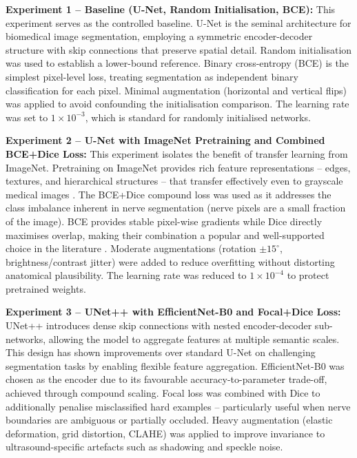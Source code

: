 \documentclass[11pt,a4paper]{article}
\begin{document}
\textbf{Experiment 1 -- Baseline (U-Net, Random Initialisation, BCE):}
This experiment serves as the controlled baseline. U-Net \cite{ronneberger2015unet} is the
seminal architecture for biomedical image segmentation, employing a symmetric
encoder-decoder structure with skip connections that preserve spatial detail.
Random initialisation was used to establish a lower-bound reference.
Binary cross-entropy (BCE) is the simplest pixel-level loss, treating segmentation
as independent binary classification for each pixel.
Minimal augmentation (horizontal and vertical flips) was applied to avoid confounding
the initialisation comparison.
The learning rate was set to $1 \times 10^{-3}$, which is standard for randomly
initialised networks.

\textbf{Experiment 2 -- U-Net with ImageNet Pretraining and Combined BCE+Dice Loss:}
This experiment isolates the benefit of transfer learning from ImageNet.
Pretraining on ImageNet provides rich feature representations -- edges, textures,
and hierarchical structures -- that transfer effectively even to grayscale medical images
\cite{tajbakhsh2016cnn}.
The BCE+Dice compound loss was used as it addresses the class imbalance inherent in
nerve segmentation (nerve pixels are a small fraction of the image).
BCE provides stable pixel-wise gradients while Dice directly maximises overlap,
making their combination a popular and well-supported choice in the literature
\cite{sudre2017generalised}.
Moderate augmentations (rotation $\pm15^\circ$, brightness/contrast jitter)
were added to reduce overfitting without distorting anatomical plausibility.
The learning rate was reduced to $1 \times 10^{-4}$ to protect pretrained weights.

\textbf{Experiment 3 -- UNet++ with EfficientNet-B0 and Focal+Dice Loss:}
UNet++ \cite{zhou2018unetplusplus} introduces dense skip connections with nested
encoder-decoder sub-networks, allowing the model to aggregate features at multiple
semantic scales. This design has shown improvements over standard U-Net on challenging
segmentation tasks by enabling flexible feature aggregation.
EfficientNet-B0 \cite{tan2019efficientnet} was chosen as the encoder due to its
favourable accuracy-to-parameter trade-off, achieved through compound scaling.
Focal loss \cite{lin2017focal} was combined with Dice to additionally penalise
misclassified hard examples -- particularly useful when nerve boundaries are
ambiguous or partially occluded.
Heavy augmentation (elastic deformation, grid distortion, CLAHE) was applied
to improve invariance to ultrasound-specific artefacts such as shadowing and
speckle noise.
\end{document}
